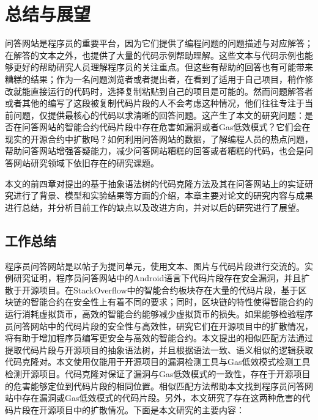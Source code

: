 
\chapter{总结与展望}\label{figures_tables}

问答网站是程序员的重要平台，因为它们提供了编程问题的问题描述与对应解答；在解答的文本之外，也提供了大量的代码示例帮助理解。这些文本与代码示例也能够更好的帮助研究人员理解程序员的关注重点。但这些有帮助的回答也有可能带来糟糕的结果；作为一名问题浏览者或者提出者，在看到了适用于自己项目，稍作修改就能直接运行的代码时，选择复制粘贴到自己的项目是可能的。然而问题解答者或者其他的编写了这段被复制代码片段的人不会考虑这种情况，他们往往专注于当前问题，仅提供最核心的代码以求清晰的回答问题。这产生了本文的研究问题：是否在问答网站的智能合约代码片段中存在危害如漏洞或者Gas低效模式？它们会在现实的开源合约中扩散吗？如何利用问答网站的数据，了解编程人员的热点问题，帮助问答网站增强答疑能力，减少问答网站糟糕的回答或者糟糕的代码，也会是问答网站研究领域下依旧存在的研究课题。

本文的前四章对提出的基于抽象语法树的代码克隆方法及其在问答网站上的实证研究进行了背景、模型和实验结果等方面的介绍，本章主要对论文的研究内容与成果进行总结，并分析目前工作的缺点以及改进方向，并对以后的研究进行了展望。

\section{工作总结}

程序员问答网站是以帖子为提问单元，使用文本、图片与代码片段进行交流的。实例研究证明，程序员问答网站中的Android语言下代码片段存在安全漏洞，并且扩散于开源项目。在StackOverflow中的智能合约板块存在大量的代码片段，基于区块链的智能合约在安全性上有着不同的要求；同时，区块链的特性使得智能合约的运行消耗虚拟货币，高效的智能合约能够减少虚拟货币的损失。如果能够检验程序员问答网站中的代码片段的安全性与高效性，研究它们在开源项目中的扩散情况，将有助于增加程序员编写更安全与高效的智能合约。本文提出的相似匹配方法通过提取代码片段与开源项目的抽象语法树，并且根据语法一致、语义相似的逻辑获取代码克隆对。本文使用仅能用于开源项目的漏洞检测工具与Gas低效模式检测工具检测开源项目。代码克隆对保证了漏洞与Gas低效模式的一致性，存在于开源项目的危害能够定位到代码片段的相同位置。相似匹配方法帮助本文找到程序员问答网站中存在漏洞或Gas低效模式的代码片段。另外，本文研究了存在这两种危害的代码片段在开源项目中的扩散情况。下面是本文研究的主要内容：

